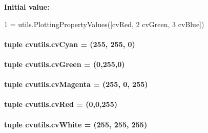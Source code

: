 {\bfseries Initial value\-:}
\begin{DoxyCode}
1 = utils.PlottingPropertyValues([cvRed,
2                                           cvGreen,
3                                           cvBlue])
\end{DoxyCode}
\hypertarget{namespacecvutils_afe0bcde1ac3ab3490dae779d6b79fad3}{
\paragraph[{cv\-Cyan}]{\setlength{\rightskip}{0pt plus 5cm}tuple cvutils.\-cv\-Cyan = (255, 255, 0)}}\label{namespacecvutils_afe0bcde1ac3ab3490dae779d6b79fad3}
\hypertarget{namespacecvutils_ae39ef1684493f0a0a2e4d59327f47f4a}{
\paragraph[{cv\-Green}]{\setlength{\rightskip}{0pt plus 5cm}tuple cvutils.\-cv\-Green = (0,255,0)}}\label{namespacecvutils_ae39ef1684493f0a0a2e4d59327f47f4a}
\hypertarget{namespacecvutils_a1e82f749ec369c57da7e9970744e428c}{
\paragraph[{cv\-Magenta}]{\setlength{\rightskip}{0pt plus 5cm}tuple cvutils.\-cv\-Magenta = (255, 0, 255)}}\label{namespacecvutils_a1e82f749ec369c57da7e9970744e428c}
\hypertarget{namespacecvutils_a680f1b0a03a6462731fa4ac22367ed73}{
\paragraph[{cv\-Red}]{\setlength{\rightskip}{0pt plus 5cm}tuple cvutils.\-cv\-Red = (0,0,255)}}\label{namespacecvutils_a680f1b0a03a6462731fa4ac22367ed73}
\hypertarget{namespacecvutils_a4d090f01341871da396b52ebff502d2c}{
\paragraph[{cv\-White}]{\setlength{\rightskip}{0pt plus 5cm}tuple cvutils.\-cv\-White = (255, 255, 255)}}\label{namespacecvutils_a4d090f01341871da396b52ebff502d2c}
